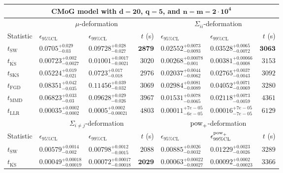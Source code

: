 \begin{tabular}{l|llr|llr}
	\toprule
	\multicolumn{7}{c}{{\bf CMoG model with $\mathbf{d=20}$, $\mathbf{q=5}$, and $\mathbf{n=m=2\cdot 10^{4}}$}} \\
	\toprule
	\multicolumn{1}{c}{} & \multicolumn{3}{c}{$\mu$-deformation} & \multicolumn{3}{c}{$\Sigma_{ii}$-deformation} \\
	Statistic & $\epsilon_{95\%\mathrm{CL}}$ & $\epsilon_{99\%\mathrm    {CL}}$ & $t$ (s) & $\epsilon_{95\%\mathrm{CL}}$ & $\epsilon_{99\%\mathrm{CL}}$ & $t$ (s) \\
	\midrule
	$t_{\mathrm{SW}}$ & $0.0705_{-0.03}^{+0.029}$ & $0.09728_{-0.027}^{+0.028}$ & ${\mathbf{2879}}$ & $0.02552_{-0.0093}^{+0.0073}$ & $0.03528_{-0.0072}^{+0.0065}$ & ${\mathbf{3063}}$ \\
	$t_{\overline{\mathrm{KS}}}$ & ${\mathbf{0.00723_{-0.0027}^{+0.002}}}$ & ${\mathbf{0.01001_{-0.0021}^{+0.0017}}}$ & $3020$ & ${\mathbf{0.00268_{-0.001}^{+0.00078}}}$ & ${\mathbf{0.00381_{-0.0008}^{+0.00066}}}$ & $3153$ \\
	$t_{\mathrm{SKS}}$ & $0.05224_{-0.021}^{+0.019}$ & $0.0723_{-0.018}^{+0.017}$ & $2976$ & $0.02037_{-0.0062}^{+0.0044}$ & $0.02765_{-0.0043}^{+0.0037}$ & $3092$ \\
	$t_{\mathrm{FGD}}$ & $0.08351_{-0.035}^{+0.042}$ & $0.11456_{-0.032}^{+0.039}$ & $3069$ & $0.02984_{-0.0089}^{+0.0081}$ & $0.04052_{-0.0069}^{+0.0071}$ & $3280$ \\
	$t_{\mathrm{MMD}}$ & $0.06823_{-0.03}^{+0.033}$ & $0.09628_{-0.026}^{+0.029}$ & $3967$ & $0.01531_{-0.0065}^{+0.0078}$ & $0.02118_{-0.0059}^{+0.0073}$ & $4361$ \\
	$t_{\mathrm{LLR}}$ & $0.00035_{-0.0002}^{+0.0002}$ & $0.0005_{-0.00021}^{+0.0002}$ & $4803$ & $0.00011_{-6e-05}^{+7e-05}$ & $0.00016_{-7e-05}^{+7e-05}$ & $6129$ \\
	\toprule
	\multicolumn{1}{c}{} & \multicolumn{3}{c}{$\Sigma_{i\neq j}$-deformation} & \multicolumn{3}{c}{$\rm{pow}_{+}$-deformation} \\
	Statistic & $\epsilon_{95\%\mathrm{CL}}$ & $\epsilon_{99\%\mathrm{CL}}$ & $t$ (s) & $\epsilon_{95\%\mathrm{CL}}$ & $\epsilon^{\rm   {pow}_{+}}_{99\%\mathrm{CL}}$ & $t$ (s) \\
	\midrule
	$t_{\mathrm{SW}}$ & $0.00579_{-0.002}^{+0.0014}$ & $0.00798_{-0.0015}^{+0.0012}$ & $2088$ & $0.00885_{-0.0032}^{+0.0026}$ & $0.01229_{-0.0026}^{+0.0023}$ & $3289$ \\
	$t_{\overline{\mathrm{KS}}}$ & ${\mathbf{0.00049_{-0.00019}^{+0.00018}}}$ & ${\mathbf{0.00072_{-0.00018}^{+0.00017}}}$ & ${\mathbf{2029}}$ & ${\mathbf{0.00063_{-0.00027}^{+0.00022}}}$ & ${\mathbf{0.00092_{-0.00023}^{+0.0002}}}$ & $3366$ \\

\end{tabular}
